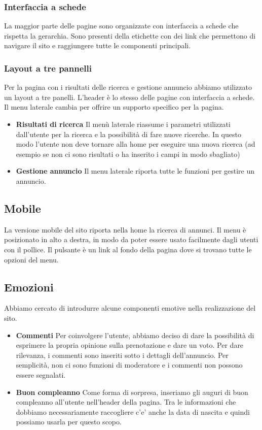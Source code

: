 \documentclass[1_relazione.tex]{subfiles}
\begin{document}
\subsubsection{Interfaccia a schede} 
La maggior parte delle pagine sono organizzate con interfaccia a schede che rispetta la gerarchia. Sono presenti della etichette con dei link che permettono di navigare il sito e raggiungere tutte le componenti principali.
\subsubsection{Layout a tre pannelli} 
Per la pagina con i risultati delle ricerca e gestione annuncio abbiamo utilizzato un layout a tre panelli. L'header \`{e} lo stesso delle pagine con interfaccia a schede. Il menu laterale cambia per offrire un supporto specifico per la pagina.

\begin{itemize}
\item \textbf{Risultati di ricerca} Il men\`{u} laterale riassume i parametri utilizzati dall'utente per la ricerca e la possibilit\`{a} di fare nuove ricerche. In questo modo l'utente non deve tornare alla home per eseguire una nuova ricerca (ad esempio se non ci sono risultati o ha inserito i campi in modo sbagliato)
\item \textbf{Gestione annuncio} Il menu laterale riporta tutte le funzioni per gestire un annuncio. 
\end{itemize}

\subsection{Mobile}
La versione mobile del sito riporta nella home la ricerca di annunci. Il menu \`{e} posizionato in alto a destra, in modo da poter essere usato facilmente dagli utenti con il pollice. Il pulsante \`{e} un link al fondo della pagina dove si trovano tutte le opzioni del menu.

\subsection{Emozioni}
Abbiamo cercato di introdurre alcune componenti emotive nella realizzazione del sito.

\begin{itemize}
\item \textbf{Commenti} Per coinvolgere l'utente, abbiamo deciso di dare la possibilit\`{a} di esprimere la propria opinione sulla prenotazione e dare un voto. Per dare rilevanza, i commenti sono inseriti sotto i dettagli dell'annuncio. Per semplicit\`{a}, non ci sono funzioni di moderatore e i commenti non possono essere segnalati.

\item \textbf{Buon compleanno} Come forma di sorpresa, inseriamo gli auguri di buon compleanno all'utente nell'header della pagina. Tra le informazioni che dobbiamo necessariamente raccogliere c'e' anche la data di nascita e quindi possiamo usarla per questo scopo.  
\end{itemize}
\end{document}
